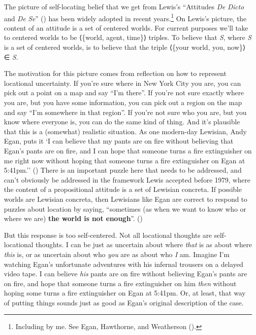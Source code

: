 \documentclass[
  10pt,
  letterpaper,
  DIV=11,
  numbers=noendperiod,
  twoside]{scrartcl}
\begin{document}
The picture of self-locating belief that we get from Lewis's ``Attitudes
\emph{De Dicto} and \emph{De Se}'' () has been widely adopted in recent years.\footnote{Including by
  me. See Egan, Hawthorne, and Weatherson
  ().} On Lewis's picture, the
content of an attitude is a set of centered worlds. For current purposes
we'll take to centered worlds to be ⟨\{world, agent, time\}⟩ triples. To
believe that \emph{S}, where \emph{S} is a set of centered worlds, is to
believe that the triple ⟨\{your world, you, now\}⟩ ∈ \emph{S}.

The motivation for this picture comes from reflection on how to
represent locational uncertainty. If you're sure where in New York City
you are, you can pick out a point on a map and say ``I'm there''. If
you're not sure exactly where you are, but you have some information,
you can pick out a region on the map and say ``I'm somewhere in that
region''. If you're not sure who you are, but you know where everyone
is, you can do the same kind of thing. And it's plausible that this is a
(somewhat) realistic situation. As one modern-day Lewisian, Andy Egan,
puts it `I can believe that my pants are on fire without believing that
Egan's pants are on fire, and I can hope that someone turns a fire
extinguisher on me right now without hoping that someone turns a fire
extinguisher on Egan at 5:41pm.'' () There is an important puzzle here that needs to be addressed,
and can't obviously be addressed in the framework Lewis accepted before
1979, where the content of a propositional attitude is a set of Lewisian
concreta. If possible worlds are Lewisian concreta, then Lewisians like
Egan are correct to respond to puzzles about location by saying,
``sometimes (as when we want to know who or where we are) \textbf{the
world is not enough}''. ()

But this response is too self-centered. Not all locational thoughts are
self-locational thoughts. I can be just as uncertain about where
\emph{that} is as about where \emph{this} is, or as uncertain about who
\emph{you} are as about who \emph{I} am. Imagine I'm watching Egan's
unfortunate adventures with his infernal trousers on a delayed video
tape. I can believe \emph{his} pants are on fire without believing
Egan's pants are on fire, and hope that someone turns a fire
extinguisher on him \emph{then} without hoping some turns a fire
extinguisher on Egan at 5:41pm. Or, at least, that way of putting things
sounds just as good as Egan's original description of the case.
\end{document}
